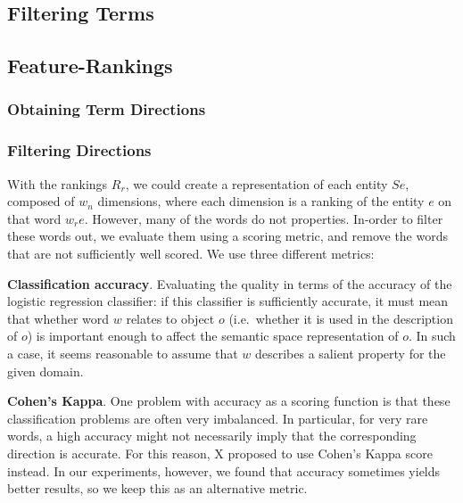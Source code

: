 \subsection{Filtering Terms}


\subsection{Feature-Rankings}


\subsubsection{Obtaining Term Directions}



\subsubsection{Filtering Directions}
With the rankings $R_r$, we could create a representation of each entity $Se$,   composed of $w_n$ dimensions, where each dimension is a ranking of the entity $e$ on that word $w_re$. However, many of the words do not  properties. In-order to filter these words out, we evaluate them using a scoring metric, and remove the words that are not sufficiently well scored. We use three different metrics:

\noindent \textbf{Classification accuracy}. Evaluating the quality in terms of the accuracy of the logistic regression classifier: if this classifier is sufficiently accurate, it must mean that whether word $w$ relates to object $o$ (i.e.\ whether it is used in the description of $o$) is important enough to affect the semantic space representation of $o$. In such a case, it seems reasonable to assume that $w$ describes a salient property for the given domain.%
\smallskip

\noindent \textbf{Cohen's Kappa}. One problem with accuracy as a scoring function is that these classification problems are often very imbalanced. In particular, for very rare words, a high accuracy might not necessarily imply that the corresponding direction is accurate. For this reason, X proposed to use Cohen's Kappa score instead. In our experiments, however, we found that accuracy sometimes yields better results, so we keep this as an alternative metric. %
\smallskip

